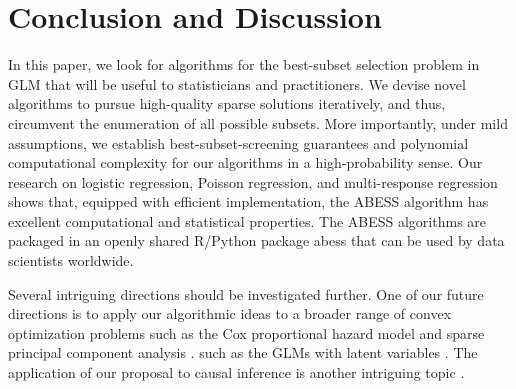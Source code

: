 \section{Conclusion and Discussion}
\label{sec:conclusion-and-discussion}

In this paper, we look for algorithms for the best-subset selection problem in GLM that will be useful to statisticians and practitioners.
We devise novel algorithms to pursue high-quality sparse solutions iteratively, and thus,
circumvent the enumeration of all possible subsets.
More importantly, under mild assumptions, we establish best-subset-screening guarantees and polynomial computational complexity for our algorithms in a high-probability sense.
Our research on logistic regression, Poisson regression, and multi-response regression shows that,
equipped with efficient implementation,
the ABESS algorithm has excellent computational and statistical properties.
The ABESS algorithms are packaged in an openly shared R/Python package abess \citep{zhu-abess-arxiv} that can be used by data scientists worldwide.

Several intriguing directions should be investigated further. 
One of our future directions is to apply our algorithmic ideas to a broader range of convex optimization problems
\informsOR
{such as the Cox proportional hazard model and sparse principal component analysis \citep{zouSparsePrincipalComponent2006}.}
\else
{such as the GLMs with latent variables \citep{zhengNonsparseLearningLatent2021}.
}\fi
The application of our proposal to causal inference is another intriguing topic
\citep{linRegularizationMethodsHighDimensional2015}.

